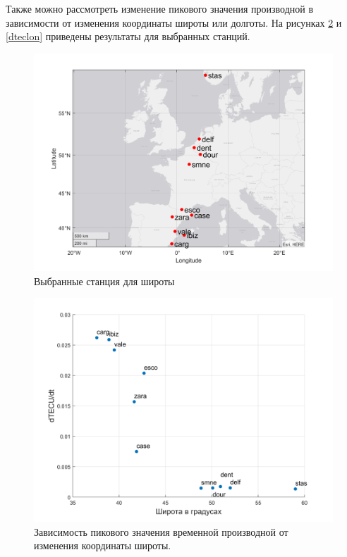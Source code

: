\documentclass[a4paper]{article}
\begin{document}
Также можно рассмотреть изменение пикового значения производной в зависимости от изменения координаты широты или долготы. На рисунках \ref{dteclat} и \ref{dteclon} приведены результаты для выбранных станций.


\begin{figure}[H]
\centering
\includegraphics[width = 1\linewidth]{pics/clean_pics/latStations.png}
\caption{Выбранные станция для широты}
\label{stationslat}
\end{figure}

\begin{figure}[H]
\centering
\includegraphics[width = 1\linewidth]{pics/clean_pics/dtec_lat.png}
\caption{Зависимость пикового значения временной производной от изменения координаты широты.}
\label{dteclat}
\end{figure}
\end{document}
